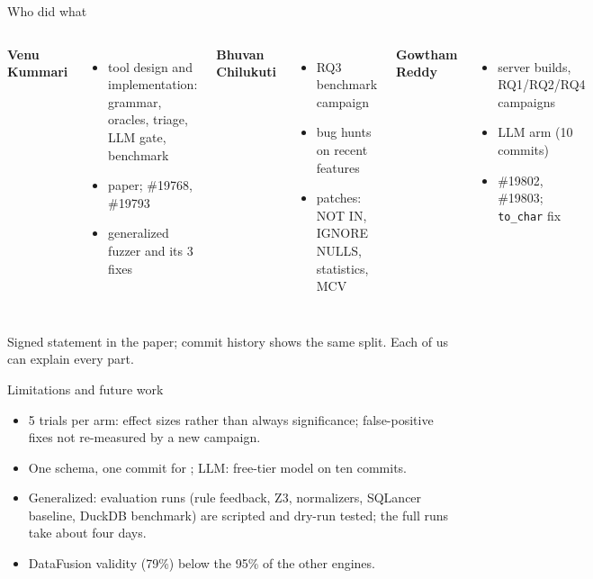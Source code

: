 \documentclass[aspectratio=169,10pt]{beamer}
\begin{document}
\begin{frame}{Who did what}
\small
\begin{columns}[T]
\textbf{Venu Kummari}
\begin{itemize}
  \item tool design and implementation: grammar, oracles, triage, LLM gate, benchmark
  \item paper; \#19768, \#19793
  \item generalized fuzzer and its 3 fixes
\end{itemize}
\textbf{Bhuvan Chilukuti}
\begin{itemize}
  \item RQ3 benchmark campaign
  \item bug hunts on recent features
  \item patches: NOT IN, IGNORE NULLS, statistics, MCV
\end{itemize}
\textbf{Gowtham Reddy}
\begin{itemize}
  \item server builds, RQ1/RQ2/RQ4 campaigns
  \item LLM arm (10 commits)
  \item \#19802, \#19803; \texttt{to\_char} fix
\end{itemize}
\end{columns}
\medskip
\small Signed statement in the paper; commit history shows the same split. Each of us can explain every part.
\end{frame}

\begin{frame}{Limitations and future work}
\small
\begin{itemize}
  \item 5 trials per arm: effect sizes rather than always significance; false-positive fixes not re-measured by a new campaign.
  \item One schema, one commit for \pg; LLM: free-tier model on ten commits.
  \item Generalized: evaluation runs (rule feedback, Z3, normalizers, SQLancer baseline, DuckDB benchmark) are scripted and dry-run tested; the full runs take about four days.
  \item DataFusion validity (79\%) below the 95\% of the other engines.
\end{itemize}
\end{frame}
\end{document}
